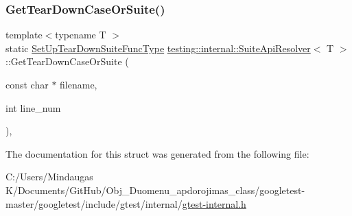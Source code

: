 \mbox{\label{structtesting_1_1internal_1_1_suite_api_resolver_a60e647dc7974c2e834812c491cbbca25}} 
\subsubsection{\texorpdfstring{GetTearDownCaseOrSuite()}{GetTearDownCaseOrSuite()}\hspace{0.1cm}{\footnotesize\ttfamily [2/2]}}
{\footnotesize\ttfamily template$<$typename T $>$ \\
static \mbox{\hyperlink{namespacetesting_1_1internal_a754d337f5d643225115fb28f6b1d6fb1}{Set\+Up\+Tear\+Down\+Suite\+Func\+Type}} \mbox{\hyperlink{structtesting_1_1internal_1_1_suite_api_resolver}{testing\+::internal\+::\+Suite\+Api\+Resolver}}$<$ T $>$\+::Get\+Tear\+Down\+Case\+Or\+Suite (\begin{DoxyParamCaption}\item[{const char $\ast$}]{filename,  }\item[{int}]{line\+\_\+num }\end{DoxyParamCaption})\hspace{0.3cm}{\ttfamily [inline]}, {\ttfamily [static]}}



The documentation for this struct was generated from the following file\+:\begin{DoxyCompactItemize}
\item 
C\+:/\+Users/\+Mindaugas K/\+Documents/\+Git\+Hub/\+Obj\+\_\+\+Duomenu\+\_\+apdorojimas\+\_\+class/googletest-\/master/googletest/include/gtest/internal/\mbox{\hyperlink{googletest-master_2googletest_2include_2gtest_2internal_2gtest-internal_8h}{gtest-\/internal.\+h}}\end{DoxyCompactItemize}
